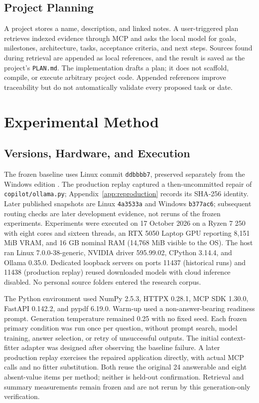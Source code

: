 \documentclass[conference,letterpaper]{IEEEtran}
\newcommand{\code}[1]{\texttt{#1}}
\begin{document}
\subsection{Project Planning}
A project stores a name, description, and linked notes. A user-triggered plan retrieves indexed evidence through MCP and asks the local model for goals, milestones, architecture, tasks, acceptance criteria, and next steps. Sources found during retrieval are appended as local references, and the result is saved as the project's \code{PLAN.md}. The implementation drafts a plan; it does not scaffold, compile, or execute arbitrary project code. Appended references improve traceability but do not automatically validate every proposed task or date.

\section{Experimental Method}
\subsection{Versions, Hardware, and Execution}
The frozen baseline uses Linux commit \code{ddbbbb7}, preserved separately from the Windows edition \cite{localmind}. The production replay captured a then-uncommitted repair of \code{copilot/ollama.py}; Appendix~\ref{app:reproduction} records its SHA-256 identity. Later published snapshots are Linux \code{4a3533a} and Windows \code{b377ac6}; subsequent routing checks are later development evidence, not reruns of the frozen experiments. Experiments were executed on 17 October 2026 on a Ryzen 7 250 with eight cores and sixteen threads, an RTX 5050 Laptop GPU reporting 8,151 MiB VRAM, and 16 GB nominal RAM (14,768 MiB visible to the OS). The host ran Linux 7.0.0-38-generic, NVIDIA driver 595.99.02, CPython 3.14.4, and Ollama 0.35.0. Dedicated loopback servers on ports 11437 (historical runs) and 11438 (production replay) reused downloaded models with cloud inference disabled. No personal source folders entered the research corpus.

The Python environment used NumPy 2.5.3, HTTPX 0.28.1, MCP SDK 1.30.0, FastAPI 0.142.2, and pypdf 6.19.0. Warm-up used a non-answer-bearing readiness prompt. Generation temperature remained 0.25 with no fixed seed. Each frozen primary condition was run once per question, without prompt search, model training, answer selection, or retry of unsuccessful outputs. The initial context-fitter adapter was designed after observing the baseline failure. A later production replay exercises the repaired application directly, with actual MCP calls and no fitter substitution. Both reuse the original 24 answerable and eight absent-value items per method; neither is held-out confirmation. Retrieval and summary measurements remain frozen and are not rerun by this generation-only verification.
\end{document}
